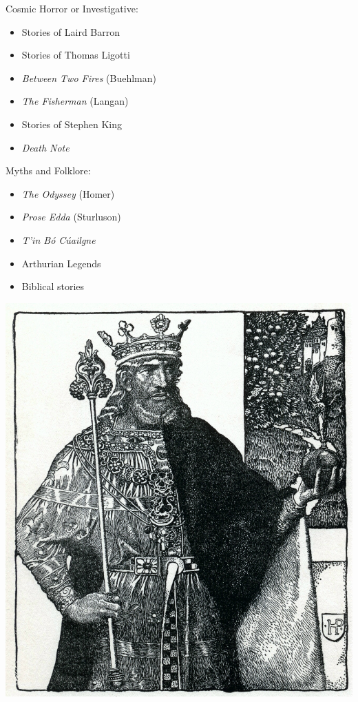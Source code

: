 \documentclass[landscape]{book}
\begin{document}
\begin{multicols*}{4}
Cosmic Horror or Investigative:
\begin{itemize}
\item Stories of Laird Barron
\item Stories of Thomas Ligotti
\item \emph{Between Two Fires} (Buehlman)
\item \emph{The Fisherman} (Langan)
\item Stories of Stephen King
\item \emph{Death Note}
\end{itemize}

Myths and Folklore:
\begin{itemize}
\item \emph{The Odyssey} (Homer)
\item \emph{Prose Edda} (Sturluson)
\item \emph{T\a'in B\'o C\'uailgne}
\item Arthurian Legends
\item Biblical stories
\end{itemize}

\includegraphics[width=\columnwidth]{./arthur}

\end{multicols*}
\end{document}
